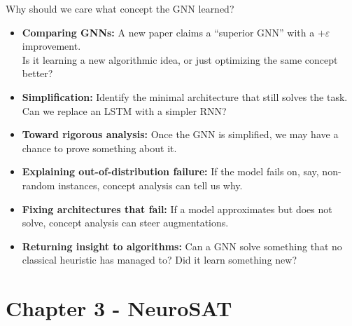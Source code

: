 \documentclass[aspectratio=169,10pt,dvipsnames]{beamer}
\begin{document}
\begin{frame}{Why should we care what concept the GNN learned?}

\small

\begin{itemize}
    \item<1-> \textbf{Comparing GNNs:}
    A new paper claims a ``superior GNN'' with a \(+\varepsilon\) improvement.\\
    Is it learning a new algorithmic idea, or just optimizing the same concept better?

    \vspace{0.25em}

    \item<2-> \textbf{Simplification:}
    Identify the minimal architecture that still solves the task.\\
    Can we replace an LSTM with a simpler RNN?

    \vspace{0.25em}

    \item<3-> \textbf{Toward rigorous analysis:}
    Once the GNN is simplified, we may have a chance to prove something about it.

    \vspace{0.25em}

    \item<4-> \textbf{Explaining out-of-distribution failure:}
    If the model fails on, say, non-random instances, concept analysis can tell us why.

    \vspace{0.25em}

    \item<5-> \textbf{Fixing architectures that fail:}
    If a model approximates but does not solve, concept analysis can steer augmentations.\\

    \vspace{0.25em}

    \item<6-> \textbf{Returning insight to algorithms:}
    Can a GNN solve something that no classical heuristic has managed to? Did it learn something new?
\end{itemize}

\end{frame}


\section{Chapter 3 - NeuroSAT}
\end{document}
